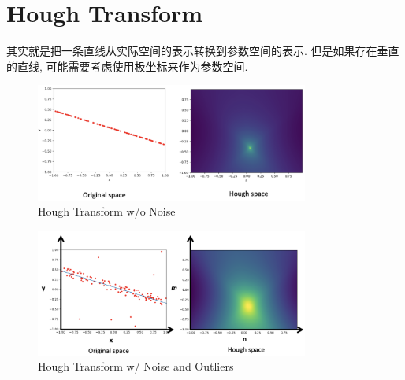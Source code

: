 \section{Hough Transform}

其实就是把一条直线从实际空间的表示转换到参数空间的表示. 但是如果存在垂直的直线, 可能需要考虑使用极坐标来作为参数空间.

\begin{figure}[htbp]
    \centering
    \includegraphics[width=0.8\textwidth]{figures/hough1.png}
    \caption{Hough Transform w/o Noise}
\end{figure}

\begin{figure}[htbp]
    \centering
    \includegraphics[width=0.8\textwidth]{figures/hough2.png}
    \caption{Hough Transform w/ Noise and Outliers}
\end{figure}